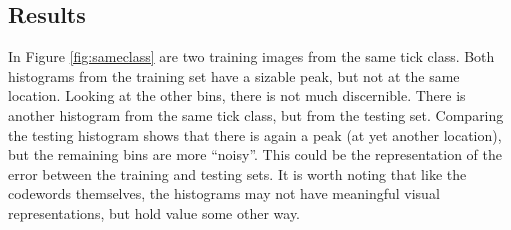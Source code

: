 \documentclass[a4paper, 10pt, conference]{ieeeconf}
\begin{document}
\subsection{Results}
In Figure \ref{fig:sameclass} are two training images from the same tick class. Both histograms from the training set have a sizable peak, but not at the same location. Looking at the other bins, there is not  much discernible. There is another histogram from the same tick class, but from the testing set. Comparing the testing histogram shows that there is again a peak (at yet another location), but the remaining bins are more ``noisy''. This could be the representation of the error between the training and testing sets. It is worth noting that like the codewords themselves, the histograms may not have meaningful visual representations, but hold value some other way.
\end{document}
